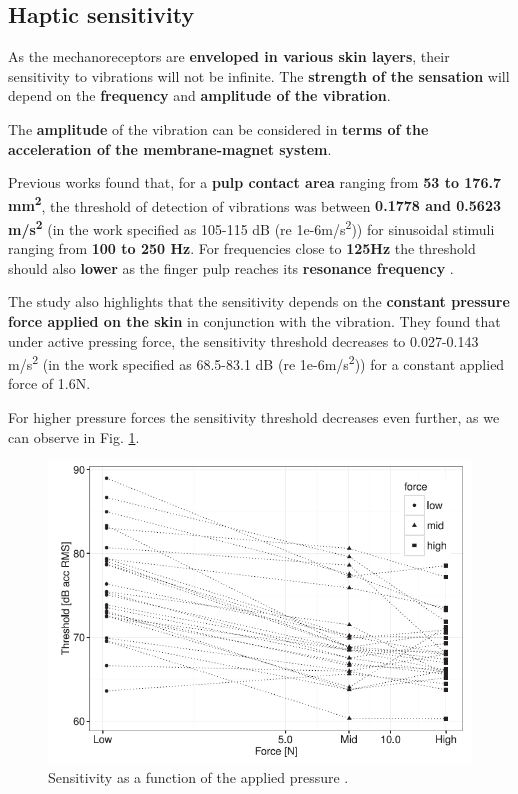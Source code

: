 \subsection{Haptic sensitivity}
\label{Haptic sensitivity}

As the mechanoreceptors are \textbf{enveloped in various skin layers}, their sensitivity to vibrations will not be infinite. The \textbf{strength of the sensation} will depend on the \textbf{frequency} and \textbf{amplitude of the vibration}. 

The \textbf{amplitude} of the vibration can be considered in \textbf{terms of the acceleration of the membrane-magnet system}.

Previous works \cite{Vibrotactile_Sensitivity} found that, for a \textbf{pulp contact area} ranging from \textbf{53 to 176.7 mm\textsuperscript{2}}, the threshold of detection of vibrations was between \textbf{0.1778 and 0.5623 m/s\textsuperscript{2}} (in the work specified as 105-115 dB (re 1e-6m/s\textsuperscript{2})) for sinusoidal stimuli ranging from \textbf{100 to 250 Hz}. 
For frequencies close to \textbf{125Hz} the threshold should also \textbf{lower} as the finger pulp reaches its \textbf{resonance frequency} \cite{Skin_freqs_penetration}.

The study also highlights that the sensitivity depends on the \textbf{constant pressure force applied on the skin} in conjunction with the vibration.
They found that under active pressing force, the sensitivity threshold decreases to 0.027-0.143 m/s\textsuperscript{2} (in the work specified as 68.5-83.1 dB (re 1e-6m/s\textsuperscript{2})) for a constant applied force of 1.6N.

\begin{samepage}
    For higher pressure forces the sensitivity threshold decreases even further, as we can observe in Fig. \ref{fig: Vibrotactile_Sensitivity}.
    \begin{figure}[H]
        \centering
        \includegraphics[width=0.5\linewidth]{Chapters/Chapter3/Haptics_Physics/Figures/vibr_thr_vs_pressure_force.png}
        \caption{Sensitivity as a function of the applied pressure \cite{Skin_freqs_penetration}.}
        \label{fig: Vibrotactile_Sensitivity}
    \end{figure}
\end{samepage}


